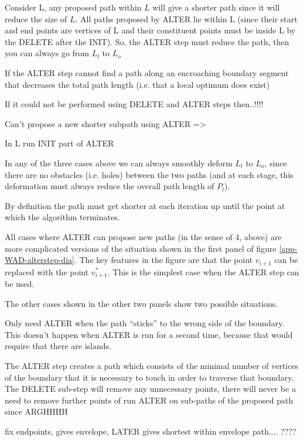 Consider L, any proposed path within $L$ will give a shorter path since it will reduce the size of $L$. All paths proposed by ALTER lie within L (since their start and end points are vertices of L and their constituent points must be inside L by the DELETE after the INIT). So, the ALTER step must reduce the path, then you can always go from $L_l$ to $L_o$


If the ALTER step cannot find a path along an encroaching boundary segment that decreases the total path length (i.e. that a local optimum does exist)


If it could not be performed using DELETE and ALTER steps then..!!!!


Can't propose a new shorter subpath using ALTER => 


In L run INIT part of ALTER


In any of the three cases above we can always smoothly deform $L_l$ to $L_o$, since there are no obstacles (i.e. holes) between the two paths (and at each stage, this deformation must always reduce the overall path length of $P_l$). 







By definition the path must get shorter at each iteration up until the point at which the algorithm terminates.

All cases where ALTER can propose new paths (in the sense of 4, above) are more complicated versions of the situation shown in the first panel of figure \ref{app-WAD-alterstep-dia}. The key features in the figure are that the point $v_{i+1}$ can be replaced with the point $v_{i+1}^*$. This is the simplest case when the ALTER step can be used. 

The other cases shown in the other two panels show two possible situations.

Only need ALTER when the path ``sticks'' to the wrong side of the boundary. This doesn't happen when ALTER is run for a second time, because that would require that there are islands.

The ALTER step creates a path which consists of the minimal number of vertices of the boundary that it is necessary to touch in order to traverse that boundary. The DELETE sub-step will remove any unnecessary points, there will never be a need to remove further points of run ALTER on sub-paths of the proposed path since ARGHHHH

fix endpoints, gives envelope, LATER gives shortest within envelope path.... ????




